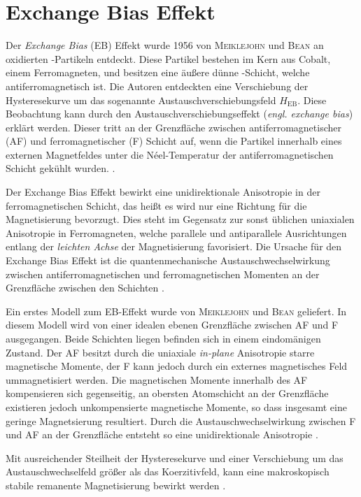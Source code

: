 \documentclass[page,pdftex,12pt,a4paper,twoside,openright]{scrbook}
\begin{document}
\section{Exchange Bias Effekt \label{sec-EB}}
\label{sec:org785d163}
Der \emph{Exchange Bias} (EB) Effekt  wurde 1956 von \textsc{Meiklejohn} und \textsc{Bean} an oxidierten -Partikeln entdeckt. Diese Partikel bestehen im Kern aus Cobalt, einem Ferromagneten, und besitzen eine äußere dünne -Schicht, welche antiferromagnetisch ist. Die Autoren entdeckten eine Verschiebung der Hysteresekurve um das sogenannte Austauschverschiebungsfeld \(H_\mathrm{EB}\). Diese Beobachtung kann durch den Austauschverschiebungseffekt (\emph{engl. exchange bias}) erklärt werden. Dieser tritt an der Grenzfläche zwischen antiferromagnetischer (AF) und ferromagnetischer (F) Schicht auf, wenn die Partikel innerhalb eines externen Magnetfeldes unter die Néel-Temperatur der antiferromagnetischen Schicht gekühlt wurden. \cite{meiklejohn_new_1957}.


Der Exchange Bias Effekt bewirkt eine unidirektionale Anisotropie in der ferromagnetischen Schicht, das heißt es wird nur eine Richtung für die Magnetisierung bevorzugt. Dies steht im Gegensatz zur sonst üblichen uniaxialen Anisotropie in Ferromagneten, welche parallele und antiparallele Ausrichtungen entlang der \emph{leichten Achse} der Magnetisierung favorisiert. Die Ursache für den Exchange Bias Effekt ist die quantenmechanische Austauschwechselwirkung zwischen antiferromagnetischen und ferromagnetischen Momenten an der Grenzfläche zwischen den Schichten \cite{stohr_magnetism_2006}. 

Ein erstes Modell zum EB-Effekt wurde von \textsc{Meiklejohn} und \textsc{Bean} geliefert. In diesem Modell wird von einer idealen ebenen Grenzfläche zwischen AF und F ausgegangen. Beide Schichten liegen befinden sich in einem eindomänigen Zustand. Der AF besitzt durch die uniaxiale \emph{in-plane} Anisotropie starre magnetische Momente, der F kann jedoch durch ein externes magnetisches Feld ummagnetisiert werden. Die magnetischen Momente innerhalb des AF kompensieren sich gegenseitig, an obersten Atomschicht an der Grenzfläche existieren jedoch unkompensierte magnetische Momente, so dass insgesamt eine geringe Magnetsierung resultiert. Durch die Austauschwechselwirkung zwischen F und AF an der Grenzfläche entsteht so eine unidirektionale Anisotropie \cite{meiklejohn_new_1957}.

Mit ausreichender Steilheit der Hysteresekurve und einer Verschiebung um das Austauschwechselfeld größer als das Koerzitivfeld, kann eine makroskopisch stabile remanente Magnetisierung bewirkt werden \cite{hohler_exchange_2008}.
\end{document}
